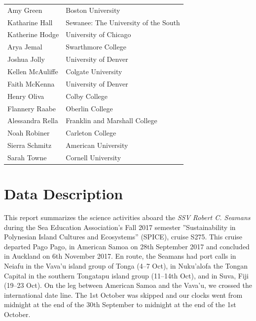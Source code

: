 \documentclass[letterpaper,11pt]{article}
\begin{document}
\begin{table}[ht]
\begin{tabular}{p{8cm} l}
  Amy Green&	Boston University\\
  Katharine Hall &	Sewanee: The University of the South\\
  Katherine Hodge &	University of Chicago\\
  Arya Jemal &	Swarthmore College \\
  Joshua Jolly &	University of Denver\\
  Kellen McAuliffe&	Colgate University\\
  Faith McKenna&	University of Denver\\
  Henry Oliva&	Colby College \\
  Flannery Raabe&	Oberlin College\\
  Alessandra Rella&	Franklin and Marshall College \\
  Noah Robiner&	Carleton College\\
  Sierra Schmitz&	American University\\
  Sarah Towne&	Cornell University\\

\end{tabular}
\end{table}

\clearpage
\section*{Data Description}

This report summarizes the science activities aboard the \textit{SSV Robert C. Seamans} during the Sea Education Association's Fall 2017 semester ''Sustainability in Polynesian Island Cultures and Ecosystems'' (SPICE), cruise S275. This cruise departed Pago Pago, in American Samoa on 28th September 2017 and concluded in Auckland on 6th November 2017. En route, the Seamans had port calls in Neiafu in the Vava'u island group of Tonga (4--7 Oct), in Nuku'alofa the Tongan Capital in the southern Tongatapu island group (11--14th Oct), and in Suva, Fiji (19--23 Oct). On the leg between American Samoa and the Vava'u, we crossed the international date line. The 1st October was skipped and our clocks went from midnight at the end of the 30th September to midnight at the end of the 1st October.
\end{document}
